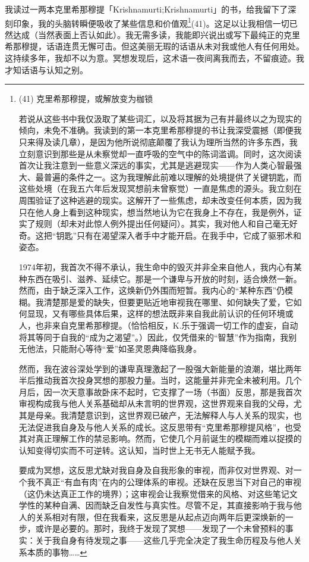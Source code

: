 我读过一两本克里希那穆提「Krishnamurti;Krishnamurti」的书，给我留下了深刻印象，我的头脑转瞬便吸收了某些信息和价值观\footnote{(41) 克里希那穆提，或解放变为枷锁

若说从这些书中我仅汲取了某些词汇，以及将其据为己有并最终以之为现实的倾向，未免不准确。我读到的第一本克里希那穆提的书让我深受震撼（即便我只来得及读几章），是因为他所说彻底颠覆了我认为理所当然的许多东西，我立刻意识到那些是从未察觉却一直呼吸的空气中的陈词滥调。同时，这次阅读首次让我注意到一些意义深远的事实，尤其是逃避现实——作为人类心智最强大、最普遍的条件之一。这为我理解此前难以理解的处境提供了关键钥匙，而这些处境（在我五六年后发现冥想前未曾察觉）一直是焦虑的源头。我立刻在周围验证了这种逃避的现实。这解开了一些焦虑，却未改变任何本质，因为我只在他人身上看到这种现实，想当然地认为它在我身上不存在，我是例外，证实了规则（却未对此惊人例外提出任何疑问）。其实，我对他人和自己毫无好奇。这把“钥匙”只有在渴望深入者手中才能开启。在我手中，它成了驱邪术和姿态。

1974年初，我首次不得不承认，我生命中的毁灭并非全来自他人，我内心有某种东西在吸引、滋养、延续它。那是一个谦卑与开放的时刻，适合焕然一新。然而，由于缺乏深入工作，这焕新仍外围而短暂。我内心的“某种东西”仍模糊。我清楚那是爱的缺失，但要更贴近地审视我在哪里、如何缺失了爱，它如何显现，又有哪些具体后果，这样的想法既非来自我此前认识的任何环境或人，也非来自克里希那穆提。（恰恰相反，K.乐于强调一切工作的虚妄，自动将其等同于自我的“成为之渴望”。）因此，仅凭借来的“智慧”作为指南，我别无他法，只能耐心等待“爱”如圣灵恩典降临我身。

然而，我在波谷深处学到的谦卑真理激起了一股强大新能量的浪潮，堪比两年半后推动我首次投身冥想的那股力量。当时，这能量并非完全未被利用。几个月后，因一次天意事故卧床不起时，它支撑了一场（书面）反思，那是我首次审视构成我与他人关系基础却从未言明的世界观，这世界观来自我的父母，尤其是母亲。我清楚意识到，这世界观已破产，无法解释人与人关系的现实，也无法促进我自身及与他人关系的成长。这反思带有“克里希那穆提风格”，也受其对真正理解工作的禁忌影响。然而，它使几个月前诞生的模糊而难以捉摸的认知变得切实而不可逆转。这认知，当时世上无书无人能赋予我。

要成为冥想，这反思尤缺对我自身及自我形象的审视，而非仅对世界观、对一个我不真正“有血有肉”在内的公理体系的审视。还缺在反思当下对自己的审视（这仍未达真正工作的境界）；这审视会让我察觉借来的风格、对这些笔记文学性的某种自满、因而缺乏自发性与真实性。尽管不足，其直接影响于我与他人的关系相对有限，但在我看来，这反思是从起点迈向两年后更深焕新的一步，或许是必要的。那时，我终于发现了冥想——发现了一个未曾预料的事实：关于我自身有待发现之事——这些几乎完全决定了我生命历程及与他人关系本质的事物……}(41)。这足以让我相信一切已然达成（当然表面上否认如此）。我无需多读，我能即兴说出或写下最纯正的克里希那穆提，话语连贯无懈可击。但这美丽无瑕的话语从未对我或他人有任何用处。这持续多年，我却不以为意。冥想发现后，这术语一夜间离我而去，不留痕迹。我才知话语与认知之别。

